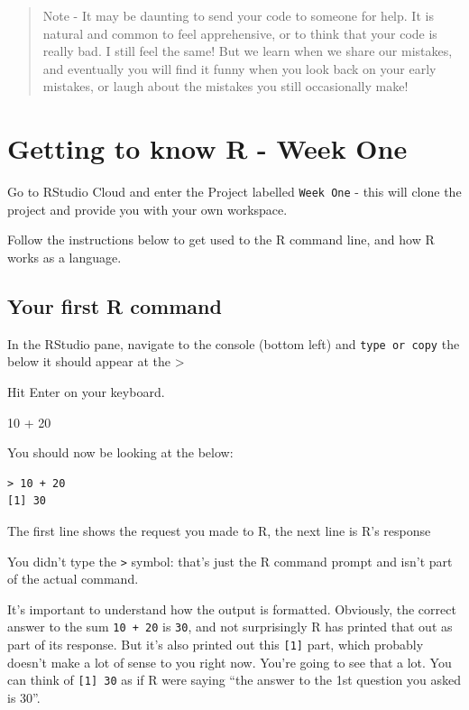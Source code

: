 \documentclass[
]{book}
\newenvironment{Shaded}{\begin{snugshade}}{\end{snugshade}}
\newcommand{\DecValTok}[1]{\textcolor[rgb]{0.00,0.00,0.81}{#1}}
\newcommand{\SpecialCharTok}[1]{\textcolor[rgb]{0.00,0.00,0.00}{#1}}
\begin{document}
\begin{quote}
Note - It may be daunting to send your code to someone for help. It is natural and common to feel apprehensive, or to think that your code is really bad. I still feel the same! But we learn when we share our mistakes, and eventually you will find it funny when you look back on your early mistakes, or laugh about the mistakes you still occasionally make!
\end{quote}

\hypertarget{getting-to-know-r---week-one}{%
\chapter{Getting to know R - Week One}\label{getting-to-know-r---week-one}}

Go to RStudio Cloud and enter the Project labelled \texttt{Week\ One} - this will clone the project and provide you with your own workspace.

Follow the instructions below to get used to the R command line, and how R works as a language.

\hypertarget{your-first-r-command}{%
\section{Your first R command}\label{your-first-r-command}}

In the RStudio pane, navigate to the console (bottom left) and \texttt{type\ or\ copy} the below it should appear at the \textgreater{}

Hit Enter on your keyboard.

\begin{Shaded}
\begin{Highlighting}[]
\DecValTok{10} \SpecialCharTok{+} \DecValTok{20}
\end{Highlighting}
\end{Shaded}

You should now be looking at the below:

\begin{verbatim}
> 10 + 20
[1] 30
\end{verbatim}

The first line shows the request you made to R, the next line is R's response

You didn't type the \texttt{\textgreater{}} symbol: that's just the R command prompt and isn't part of the actual command.

It's important to understand how the output is formatted. Obviously, the correct answer to the sum \texttt{10\ +\ 20} is \texttt{30}, and not surprisingly R has printed that out as part of its response. But it's also printed out this \texttt{{[}1{]}} part, which probably doesn't make a lot of sense to you right now. You're going to see that a lot. You can think of \texttt{{[}1{]}\ 30} as if R were saying ``the answer to the 1st question you asked is 30''.
\end{document}
